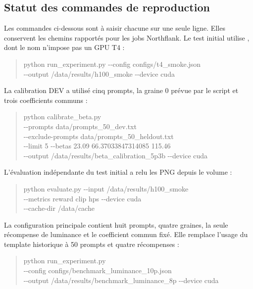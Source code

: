 \documentclass[11pt,a4paper]{article}
\newcommand{\code}[1]{\texttt{\detokenize{#1}}}
\begin{document}
\subsection{Statut des commandes de reproduction}
Les commandes ci-dessous sont à saisir chacune sur une seule ligne. Elles conservent les chemins rapportés pour les jobs Northflank. Le test initial utilise \code{configs/t4_smoke.json}, dont le nom n'impose pas un GPU T4 :
\begin{quote}\small\ttfamily
python run\_experiment.py -{}-config configs/t4\_smoke.json\\
\hspace*{1em}-{}-output /data/results/h100\_smoke -{}-device cuda
\end{quote}
La calibration DEV a utilisé cinq prompts, la graine 0 prévue par le script et trois coefficients communs :
\begin{quote}\small\ttfamily
python calibrate\_beta.py\\
\hspace*{1em}-{}-prompts data/prompts\_50\_dev.txt\\
\hspace*{1em}-{}-exclude-prompts data/prompts\_50\_heldout.txt\\
\hspace*{1em}-{}-limit 5 -{}-betas 23.09 66.37033847314085 115.46\\
\hspace*{1em}-{}-output /data/results/beta\_calibration\_5p3b -{}-device cuda
\end{quote}
L'évaluation indépendante du test initial a relu les PNG depuis le volume :
\begin{quote}\small\ttfamily
python evaluate.py -{}-input /data/results/h100\_smoke\\
\hspace*{1em}-{}-metrics reward clip hps -{}-device cuda\\
\hspace*{1em}-{}-cache-dir /data/cache
\end{quote}
\begin{samepage}
La configuration principale contient huit prompts, quatre graines, la seule récompense de luminance et le coefficient commun fixé. Elle remplace l'usage du template historique à 50 prompts et quatre récompenses :
\begin{quote}\small\ttfamily
python run\_experiment.py\\
\hspace*{1em}-{}-config configs/benchmark\_luminance\_10p.json\\
\hspace*{1em}-{}-output /data/results/benchmark\_luminance\_8p -{}-device cuda
\end{quote}
\end{samepage}
\end{document}
